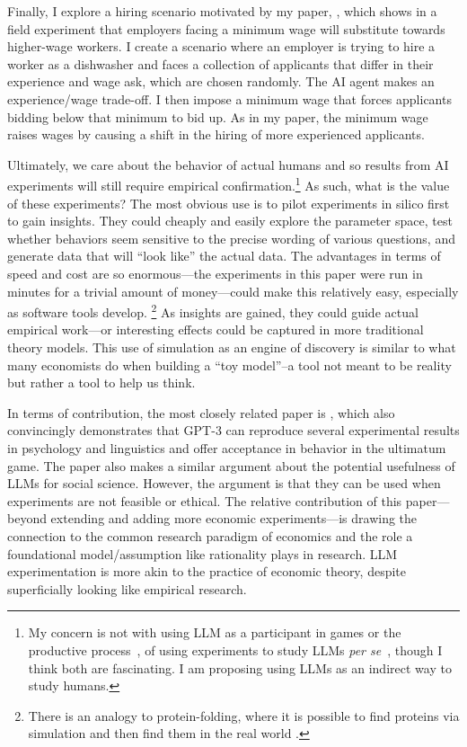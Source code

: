 \documentclass[11pt]{article}
\begin{document}
Finally, I explore a hiring scenario motivated by my paper, \cite{horton2023}, which shows in a field experiment that employers facing a minimum wage will substitute towards higher-wage workers. 
I create a scenario where an employer is trying to hire a worker as a dishwasher and faces a collection of applicants that differ in their experience and wage ask, which are chosen randomly.
The AI agent makes an experience/wage trade-off.
I then impose a minimum wage that forces applicants bidding below that minimum to bid up.
As in my paper, the minimum wage raises wages by causing a shift in the hiring of more experienced applicants. 

Ultimately, we care about the behavior of actual humans and so results from AI experiments will still require empirical confirmation.\footnote{
    My concern is not with using LLM as a participant in games or the productive process~\citep{westby2022}, of using experiments to study LLMs \emph{per se}~\citep{alberti2019bert}, though I think both are fascinating. 
    I am proposing using LLMs as an indirect way to study humans.
}
As such, what is the value of these experiments? 
The most obvious use is to pilot experiments in silico first to gain insights.
They could cheaply and easily explore the parameter space, test whether behaviors seem sensitive to the precise wording of various questions, and generate data that will ``look like'' the actual data.
The advantages in terms of speed and cost are so enormous---the experiments in this paper were run in minutes for a trivial amount of money---could make this relatively easy, especially as software tools develop.
\footnote{
There is an analogy to protein-folding, where it is possible to find proteins via simulation and then find them in the real world \citep{kuhlman2003design}.
}
As insights are gained, they could guide actual empirical work---or interesting effects could be captured in more traditional theory models.
This use of simulation as an engine of discovery is similar to what many economists do when building a ``toy model''--a tool not meant to be reality but rather a tool to help us think.

In terms of contribution, the most closely related paper is \cite{aher2022using}, which also convincingly demonstrates that GPT-3 can reproduce several experimental results in psychology and linguistics and offer acceptance in behavior in the ultimatum game.
The paper also makes a similar argument about the potential usefulness of LLMs for social science. However, the argument is that they can be used when experiments are not feasible or ethical. 
The relative contribution of this paper---beyond extending and adding more economic experiments---is drawing the connection to the common research paradigm of economics and the role a foundational model/assumption like rationality plays in research.
LLM experimentation is more akin to the practice of economic theory, despite superficially looking like empirical research.
\end{document}
